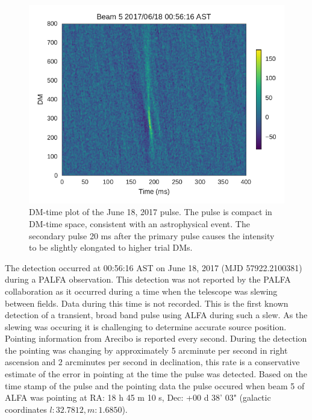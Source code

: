 \documentclass[a4paper,fleqn,usenatbib]{mnras}
\begin{document}
\begin{figure}
    \includegraphics[width=1.0\linewidth]{figures/Beam5_fb_D20170618T005616_buffer2_dmspace.pdf}
    \caption{DM-time plot of the June 18, 2017 pulse. The pulse is compact in
    DM-time space, consistent with an astrophysical event. The secondary pulse
    20 ms after the primary pulse causes the intensity to be slightly elongated
    to higher trial DMs.
    }
    \label{fig:D20170618_dmspace}
\end{figure}

The detection occurred at 00:56:16 AST on June 18, 2017 (MJD 57922.2100381)
during a PALFA observation. This detection was not reported by the PALFA
collaboration as it occurred during a time when the telescope was slewing between
fields. Data during this time is not recorded. This is the first known detection
of a transient, broad band pulse using ALFA during such a slew. As the slewing
was occuring it is challenging to determine accurate source position. Pointing
information from Arecibo is reported every second. During the detection the
pointing was changing by approximately 5 arcminute per second in right ascension
and 2 arcminutes per second in declination, this rate is a conservative estimate
of the error in pointing at the time the pulse was detected. Based on the time
stamp of the pulse and the pointing data the pulse occured when beam 5 of ALFA
was pointing at RA: 18 h 45 m 10 s, Dec: +00 d 38' 03" (galactic coordinates $l:
32.7812, m: 1.6850$).
\end{document}
